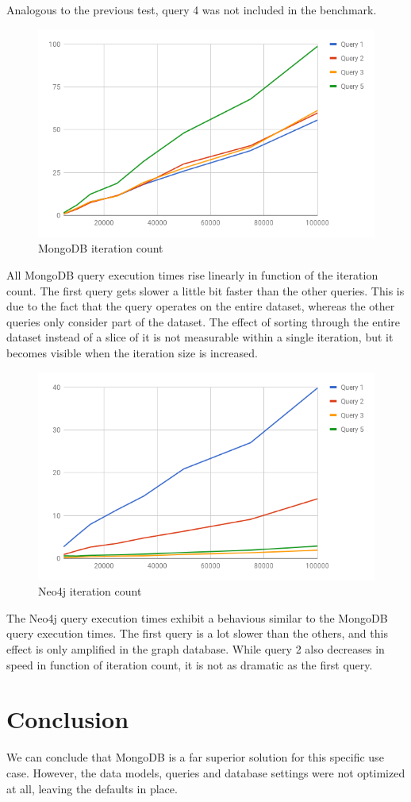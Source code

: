 Analogous to the previous test, query 4 was not included in the benchmark.

\begin{figure}[H]
  \centering
  \includegraphics[width=.8\textwidth]{img/mongodb-iteration-count.png}
  \caption{MongoDB iteration count}
  \label{fig:mongodb-iteration-count}
\end{figure}

All MongoDB query execution times rise linearly in function of the iteration count.
The first query gets slower a little bit faster than the other queries.
This is due to the fact that the query operates on the entire dataset, whereas the other queries only consider part of the dataset.
The effect of sorting through the entire dataset instead of a slice of it is not measurable within a single iteration, but it becomes visible when the iteration size is increased.

\begin{figure}[H]
  \centering
  \includegraphics[width=.8\textwidth]{img/neo4j-iteration-count.png}
  \caption{Neo4j iteration count}
  \label{fig:neo4j-iteration-count}
\end{figure}

The Neo4j query execution times exhibit a behavious similar to the MongoDB query execution times.
The first query is a lot slower than the others, and this effect is only amplified in the graph database.
While query 2 also decreases in speed in function of iteration count, it is not as dramatic as the first query.

\section{Conclusion}
\label{sec:empirical-study-conclusion}

We can conclude that MongoDB is a far superior solution for this specific use case.
However, the data models, queries and database settings were not optimized at all, leaving the defaults in place.
